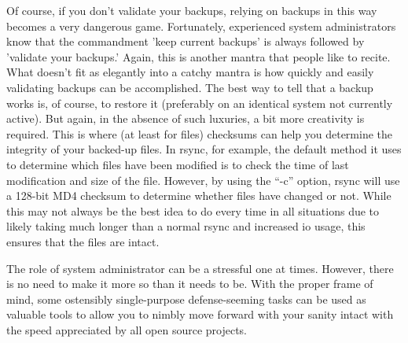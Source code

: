 Of course, if you don't validate your backups, relying on backups in this way
becomes a very dangerous game.  Fortunately, experienced system administrators
know that the commandment 'keep current backups' is always followed by 'validate
your backups.' Again, this is another mantra that people like to recite.  What
doesn't fit as elegantly into a catchy mantra is how quickly and easily
validating backups can be accomplished. The best way to tell that a backup works
is, of course, to restore it (preferably on an identical system not currently
active). But again, in the absence of such luxuries, a bit more creativity is
required. This is where (at least for files) checksums can help you determine
the integrity of your backed-up files. In rsync, for example, the default method
it uses to determine which files have been modified is to check the time of last
modification and size of the file.  However, by using the “-c” option, rsync
will use a 128-bit MD4 checksum to determine whether files have changed or not.
While this may not always be the best idea to do every time in all situations
due to likely taking much longer than a normal rsync and increased io usage,
this ensures that the files are intact.

The role of system administrator can be a stressful one at times.  However,
there is no need to make it more so than it needs to be.  With the proper frame
of mind, some ostensibly single-purpose defense-seeming tasks can be used as
valuable tools to allow you to nimbly move forward with your sanity intact with
the speed appreciated by all open source projects.
